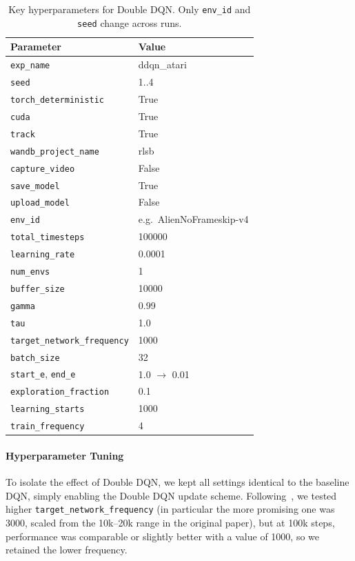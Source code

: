\begin{table}
	\caption{Key hyperparameters for Double DQN. Only \texttt{env\_id} and \texttt{seed} change across runs.}
	\label{tab:ddqn_hyperparams}
	\centering
	\begin{tabular}{ll}
		\toprule
		\textbf{Parameter} & \textbf{Value} \\
		\midrule
		\texttt{exp\_name}                & ddqn\_atari \\
		\texttt{seed}                     & 1..4 \\
		\texttt{torch\_deterministic}     & True \\
		\texttt{cuda}                     & True \\
		\texttt{track}                    & True \\
		\texttt{wandb\_project\_name}     & rlsb \\
		\texttt{capture\_video}           & False \\
		\texttt{save\_model}              & True \\
		\texttt{upload\_model}            & False \\
		\texttt{env\_id}                  & e.g.\ AlienNoFrameskip-v4 \\
		\texttt{total\_timesteps}         & 100000 \\
		\texttt{learning\_rate}           & 0.0001 \\
		\texttt{num\_envs}                & 1 \\
		\texttt{buffer\_size}             & 10000 \\
		\texttt{gamma}                    & 0.99 \\
		\texttt{tau}                      & 1.0 \\
		\texttt{target\_network\_frequency} & 1000 \\
		\texttt{batch\_size}             & 32 \\
		\texttt{start\_e}, \texttt{end\_e} & 1.0 $\to$ 0.01 \\
		\texttt{exploration\_fraction}    & 0.1 \\
		\texttt{learning\_starts}         & 1000 \\
		\texttt{train\_frequency}         & 4 \\
		\bottomrule
	\end{tabular}
\end{table}

\paragraph{Hyperparameter Tuning}
To isolate the effect of Double DQN, we kept all settings identical to the baseline DQN, simply enabling the Double DQN update scheme. 
Following~\cite{van:double_q}, we tested higher \texttt{target\_network\_frequency} (in particular the more promising one was \num{3000}, scaled from the 10k--20k range in the original paper), but at 100k steps, performance was comparable or slightly better with a value of \num{1000}, so we retained the lower frequency. 

